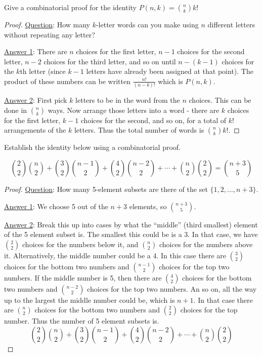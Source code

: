 \begin{questions}
	
	
	
\question Give a combinatorial proof for the identity $P(n,k) = {n \choose k}k!$
	
	\begin{answer}
		\begin{proof}
         \underline{Question}: How many $k$-letter words can you make using $n$ different letters without repeating any letter?
         
         \underline{Answer 1}: There are $n$ choices for the first letter, $n-1$ choices for the second letter, $n-2$ choices for the third letter, and so on until $n - (k-1)$ choices for the $k$th letter (since $k-1$ letters have already been assigned at that point).  The product of these numbers can be written $\frac{n!}{(n-k)!}$ which is $P(n,k)$.
         
         \underline{Answer 2}: First pick $k$ letters to be in the word from the $n$ choices.  This can be done in ${n \choose k}$ ways.  Now arrange those letters into a word - there are $k$ choices for the first letter, $k-1$ choices for the second, and so on, for a total of $k!$ arrangements of the $k$ letters.  Thus the total number of words is ${n \choose k}k!$.
        \end{proof}
	\end{answer}
	
	
	
\question Establish the identity below using a combinatorial proof.

\[{2 \choose 2}{n \choose 2} + {3 \choose 2}{n-1 \choose 2} + {4\choose 2}{n-2 \choose 2} + \cdots + {n\choose 2}{2\choose 2} = {n+3 \choose 5} \]


	\begin{answer}
		\begin{proof}
		\underline{Question}: How many 5-element subsets are there of the set $\{1,2,\ldots, n+3\}$.
		
		\underline{Answer 1}: We choose 5 out of the $n+3$ elements, so ${n+3 \choose 5}$.
		
		\underline{Answer 2}: Break this up into cases by what the ``middle'' (third smallest) element of the 5 element subset is.  The smallest this could be is a 3.  In that case, we have ${2 \choose 2}$ choices for the numbers below it, and ${n \choose 2}$ choices for the numbers above it.  Alternatively, the middle number could be a 4.  In this case there are ${3 \choose 2}$ choices for the bottom two numbers and ${n-1 \choose 2}$ choices for the top two numbers.  If the middle number is 5, then there are ${4 \choose 2}$ choices for the bottom two numbers and ${n-2 \choose 2}$ choices for the top two numbers.  An so on, all the way up to the largest the middle number could be, which is $n+1$.  In that case there are ${n \choose 2}$ choices for the bottom two numbers and ${2 \choose 2}$ choices for the top number.  Thus the number of 5 element subsets is.
		\[{2 \choose 2}{n \choose 2} + {3 \choose 2}{n-1 \choose 2} + {4\choose 2}{n-2 \choose 2} + \cdots + {n\choose 2}{2\choose 2}\]
		\end{proof}
	\end{answer}
	
	
	
\end{questions}